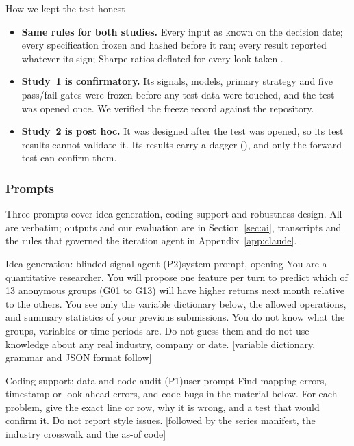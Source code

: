 \documentclass[11pt,letterpaper]{article}
\newenvironment{protocolbox}{\begin{panel}{How we kept the test honest}}{\end{panel}}
\begin{document}
\begin{protocolbox}
\begin{itemize}[leftmargin=1.1em]
\item \textbf{Same rules for both studies.} Every input as known on the
  decision date; every specification frozen and hashed before it ran; every
  result reported whatever its sign; Sharpe ratios deflated for every look taken
  \citep{bailey2014}.
\item \textbf{Study~1 is confirmatory.} Its signals, models, primary strategy and
  five pass/fail gates were frozen before any test data were touched, and the
  test was opened once. We verified the freeze record against the repository.
\item \textbf{Study~2 is post hoc.} It was designed after the test was opened,
  so its test results cannot validate it. Its results carry a dagger (\dag),
  and only the forward test can confirm them.
\end{itemize}
\end{protocolbox}

\subsubsection{Prompts}
Three prompts cover idea generation, coding support and robustness design. All
are verbatim; outputs and our evaluation are in Section~\ref{sec:ai}, transcripts
and the rules that governed the iteration agent in Appendix~\ref{app:claude}.

\begin{promptbox}{Idea generation: blinded signal agent (P2)}{system prompt, opening}
You are a quantitative researcher. You will propose one feature per turn to
predict which of 13 anonymous groups (G01 to G13) will have higher returns next
month relative to the others. You see only the variable dictionary below, the
allowed operations, and summary statistics of your previous submissions. You do
not know what the groups, variables or time periods are. Do not guess them and
do not use knowledge about any real industry, company or date. [variable
dictionary, grammar and JSON format follow]
\end{promptbox}

\begin{promptbox}{Coding support: data and code audit (P1)}{user prompt}
Find mapping errors, timestamp or look-ahead errors, and code bugs in the
material below. For each problem, give the exact line or row, why it is wrong,
and a test that would confirm it. Do not report style issues. [followed by the
series manifest, the industry crosswalk and the as-of code]
\end{promptbox}
\end{document}

